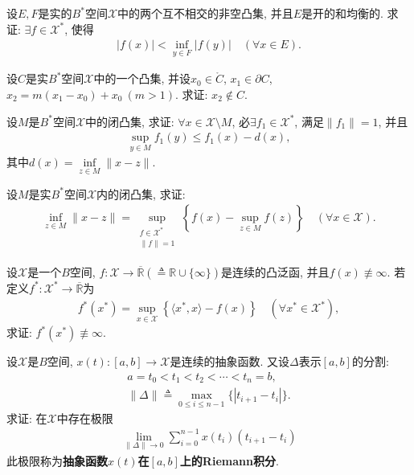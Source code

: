 \documentclass[../../main.tex]{subfiles}%
\begin{document}
\begin{example}
设$E,F$是实的$B^*$空间$\mathscr{X}$中的两个互不相交的非空凸集, 并且$E$是开的和均衡的. 求证: $\exists f \in \mathscr{X}^*$, 使得
\begin{align*}
|f(x)| < \inf\limits_{y \in F} |f(y)| \quad (\forall x \in E).
\end{align*}
\end{example}

\begin{example}
设$C$是实$B^*$空间$\mathscr{X}$中的一个凸集, 并设$x_0 \in \mathring{C}$, $x_1 \in \partial C$, $x_2 = m(x_1 - x_0) + x_0 \ (m > 1)$. 求证: $x_2 \notin C$.
\end{example}

\begin{example}
设$M$是$B^*$空间$\mathscr{X}$中的闭凸集, 求证: $\forall x \in \mathscr{X} \setminus M$, 必$\exists f_1 \in \mathscr{X}^*$, 满足$\|f_1\| = 1$, 并且
\begin{align*}
\sup\limits_{y \in M} f_1(y) \leqslant f_1(x) - d(x),
\end{align*}
其中$d(x) = \inf\limits_{z \in M} \|x - z\|$.
\end{example}

\begin{example}
设$M$是实$B^*$空间$\mathscr{X}$内的闭凸集, 求证:
\begin{align*}
\inf\limits_{z \in M} \|x - z\| = \sup\limits_{\substack{f \in \mathscr{X}^* \\ \|f\| = 1}} \left\{ f(x) - \sup\limits_{z \in M} f(z) \right\} \quad (\forall x \in \mathscr{X}).
\end{align*}
\end{example}

\begin{example}
设$\mathscr{X}$是一个$B$空间, $f: \mathscr{X} \to \overline{\mathbb{R}} (\triangleq \mathbb{R} \cup \{\infty\})$是连续的凸泛函, 并且$f(x) \not\equiv \infty$. 若定义$f^*: \mathscr{X}^* \to \overline{\mathbb{R}}$为
\begin{align*}
f^*(x^*) = \sup\limits_{x \in \mathscr{X}} \left\{ \langle x^*, x \rangle - f(x) \right\} \quad (\forall x^* \in \mathscr{X}^*),
\end{align*}
求证: $f^*(x^*) \not\equiv \infty$.
\end{example}

\begin{example}
设$\mathscr{X}$是$B$空间, $x(t): [a,b] \to \mathscr{X}$是连续的抽象函数. 又设$\Delta$表示$[a,b]$的分割:
\begin{align*}
a = t_0 < t_1 < t_2 < \cdots < t_n = b, \\
\|\Delta\| \triangleq \max\limits_{0 \leqslant i \leqslant n-1} \{|t_{i+1} - t_i|\}.
\end{align*}
求证: 在$\mathscr{X}$中存在极限
\begin{align*}
\lim\limits_{\|\Delta\| \to 0} \sum\limits_{i=0}^{n-1} x(t_i)(t_{i+1} - t_i)
\end{align*}
此极限称为\textbf{抽象函数$x(t)$在$[a,b]$上的Riemann积分}.
\end{example}
\end{document}
